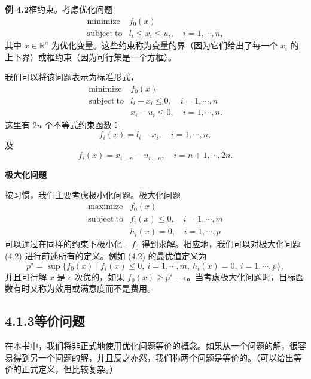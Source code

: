\documentclass[UTF8,12pt,a4paper,fontset=fandol]{ctexart}
\begin{document}
\noindent\textbf{例 4.2}\quad 框约束。考虑优化问题
\[
\begin{array}{ll}
\mathop{\mathrm{minimize}} & f_0(x)\\
\mathrm{subject\ to} & l_i\leq x_i\leq u_i,\quad i=1,\cdots,n,
\end{array}
\]
其中 $x\in\mathbb{R}^n$ 为优化变量。这些约束称为变量的界（因为它们给出了每一个 $x_i$ 的上下界）或框约束（因为可行集是一个方框）。

我们可以将该问题表示为标准形式，
\[
\begin{array}{ll}
\mathop{\mathrm{minimize}} & f_0(x)\\
\mathrm{subject\ to} & l_i-x_i\leq 0,\quad i=1,\cdots,n\\
& x_i-u_i\leq 0,\quad i=1,\cdots,n.
\end{array}
\]
这里有 $2n$ 个不等式约束函数：
\[
f_i(x)=l_i-x_i,\quad i=1,\cdots,n,
\]
及
\[
f_i(x)=x_{i-n}-u_{i-n},\quad i=n+1,\cdots,2n.
\]

\noindent\textbf{极大化问题}

按习惯，我们主要考虑极小化问题。极大化问题
\begin{equation}
\begin{array}{ll}
\mathop{\mathrm{maximize}} & f_0(x)\\
\mathrm{subject\ to} & f_i(x)\leq 0,\quad i=1,\cdots,m\\
& h_i(x)=0,\quad i=1,\cdots,p
\end{array}
\tag{4.2}
\end{equation}
可以通过在同样的约束下极小化 $-f_0$ 得到求解。相应地，我们可以对极大化问题 (4.2) 进行前述所有的定义。例如 (4.2) 的最优值定义为
\[
p^\star=\sup\{f_0(x)\mid f_i(x)\leq 0,\ i=1,\cdots,m,\ h_i(x)=0,\ i=1,\cdots,p\},
\]
并且可行解 $x$ 是 $\epsilon$-次优的，如果 $f_0(x)\geq p^\star-\epsilon$。当考虑极大化问题时，目标函数有时又称为效用或满意度而不是费用。

\subsection*{4.1.3\quad 等价问题}

在本书中，我们将非正式地使用优化问题等价的概念。如果从一个问题的解，很容易得到另一个问题的解，并且反之亦然，我们称两个问题是等价的。（可以给出等价的正式定义，但比较复杂。）
\end{document}
